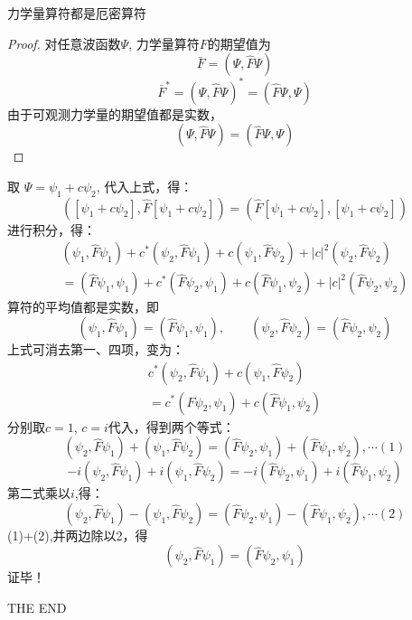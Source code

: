 \begin{frame} [allowframebreaks=]
    \begin{tcolorbox}[colback=yellow!10,colframe=red!75!black,title=命题]
    力学量算符都是厄密算符  
    \end{tcolorbox}
    \begin{proof}
        对任意波函数$\Psi$, 力学量算符$F$的期望值为\\
        $$\bar{F}=(\Psi,\hat{F} \Psi) $$
        $$\bar{F}^*=(\Psi, \hat{F} \Psi)^* = (\hat{F}\Psi, \Psi) $$
        由于可观测力学量的期望值都是实数，\\
        $$(\Psi,\hat{F}\Psi)=(\hat{F} \Psi, \Psi) $$
    \end{proof}
\end{frame} 

\begin{frame} [allowframebreaks=]
        取 $\Psi= \psi_1+c\psi_2 $, 代入上式，得：
        $$([\psi_1+c\psi_2],\hat{F} [\psi_1+c\psi_2])=(\hat{F}[\psi_1+c\psi_2],[\psi_1+c\psi_2]) $$
        进行积分，得：
        $$
        \begin{array}{r}
        \left(\psi_{1}, \hat{F} \psi_{1}\right)+c^{*}\left(\psi_{2}, \hat{F} \psi_{1}\right)+c\left(\psi_{1}, \hat{F} \psi_{2}\right)+|c|^{2}\left(\psi_{2}, \hat{F} \psi_{2}\right) \\
        =\left(\hat{F} \psi_{1}, \psi_{1}\right)+c^{*}\left(\hat{F} \psi_{2}, \psi_{1}\right)+c\left(\hat{F} \psi_{1}, \psi_{2}\right)+|c|^{2}\left(\hat{F} \psi_{2}, \psi_{2}\right)
        \end{array}
        $$
        算符的平均值都是实数，即 
        $$(\psi_1,\hat{F}\psi_1)=(\hat{F} \psi_1, \psi_1), \qquad (\psi_2,\hat{F}\psi_2)=(\hat{F} \psi_2, \psi_2) $$
        上式可消去第一、四项，变为：
        $$\begin{array}{r}
            c^{*}\left(\psi_{2}, \hat{F} \psi_{1}\right)+c\left(\psi_{1}, \hat{F} \psi_{2}\right) \\
            =c^{*}\left(\hat{F} \psi_{2}, \psi_{1}\right)+c\left(\hat{F} \psi_{1}, \psi_{2}\right)
        \end{array}$$
        分别取$c=1$, $c=i$代入，得到两个等式：
        $$  \left(\psi_{2}, \hat{F} \psi_{1}\right)+\left(\psi_{1}, \hat{F} \psi_{2}\right) = 
        \left(\hat{F} \psi_{2}, \psi_{1}\right)+\left(\hat{F} \psi_{1}, \psi_{2}\right) , \cdots (1)
        $$
        $$
        -i\left(\psi_{2}, \hat{F} \psi_{1}\right)+i\left(\psi_{1}, \hat{F} \psi_{2}\right) 
        =-i\left(\hat{F} \psi_{2}, \psi_{1}\right)+i\left(\hat{F} \psi_{1}, \psi_{2}\right)
        $$
        第二式乘以$i$,得：
        $$
        \left(\psi_{2}, \hat{F} \psi_{1}\right)-\left(\psi_{1}, \hat{F} \psi_{2}\right) 
        =\left(\hat{F} \psi_{2}, \psi_{1}\right)-\left(\hat{F} \psi_{1}, \psi_{2}\right), \cdots (2)
        $$
        (1)+(2),并两边除以2，得
        $$
        \left(\psi_{2}, \hat{F} \psi_{1}\right) =\left(\hat{F} \psi_{2}, \psi_{1}\right)
        $$
        证毕！
\end{frame} 

\begin{frame} [allowframebreaks=]
    THE END
\end{frame} 
